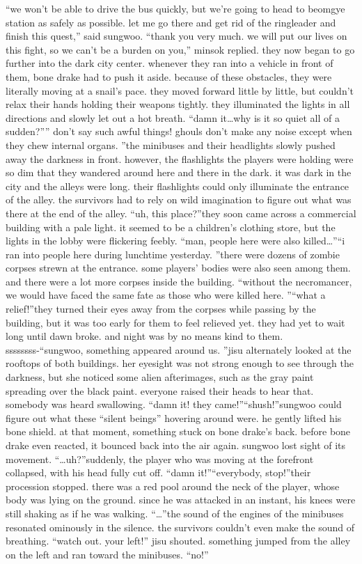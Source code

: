 “we won’t be able to drive the bus quickly, but we’re going to head to beomgye station as safely as possible.
 let me go there and get rid of the ringleader and finish this quest,” said sungwoo.
“thank you very much.
 we will put our lives on this fight, so we can’t be a burden on you,” minsok replied.
they now began to go further into the dark city center.
whenever they ran into a vehicle in front of them, bone drake had to push it aside.
because of these obstacles, they were literally moving at a snail’s pace.
they moved forward little by little, but couldn’t relax their hands holding their weapons tightly.
they illuminated the lights in all directions and slowly let out a hot breath.
“damn it…why is it so quiet all of a sudden?”” don’t say such awful things! ghouls don’t make any noise except when they chew internal organs.
”the minibuses and their headlights slowly pushed away the darkness in front.
 however, the flashlights the players were holding were so dim that they wandered around here and there in the dark.
it was dark in the city and the alleys were long.
 their flashlights could only illuminate the entrance of the alley.
 the survivors had to rely on wild imagination to figure out what was there at the end of the alley.
“uh, this place?”they soon came across a commercial building with a pale light.
 it seemed to be a children’s clothing store, but the lights in the lobby were flickering feebly.
“man, people here were also killed…”“i ran into people here during lunchtime yesterday.
”there were dozens of zombie corpses strewn at the entrance.
 some players’ bodies were also seen among them.
 and there were a lot more corpses inside the building.
“without the necromancer, we would have faced the same fate as those who were killed here.
”“what a relief!”they turned their eyes away from the corpses while passing by the building, but it was too early for them to feel relieved yet.
 they had yet to wait long until dawn broke.
and night was by no means kind to them.
ssssssss-“sungwoo, something appeared around us.
”jisu alternately looked at the rooftops of both buildings.
 her eyesight was not strong enough to see through the darkness, but she noticed some alien afterimages, such as the gray paint spreading over the black paint.
everyone raised their heads to hear that.
 somebody was heard swallowing.
“damn it! they came!”“shush!”sungwoo could figure out what these “silent beings” hovering around were.
he gently lifted his bone shield.
at that moment, something stuck on bone drake’s back.
 before bone drake even reacted, it bounced back into the air again.
 sungwoo lost sight of its movement.
“…uh?”suddenly, the player who was moving at the forefront collapsed, with his head fully cut off.
“damn it!”“everybody, stop!”their procession stopped.
 there was a red pool around the neck of the player, whose body was lying on the ground.
 since he was attacked in an instant, his knees were still shaking as if he was walking.
“…”the sound of the engines of the minibuses resonated ominously in the silence.
 the survivors couldn’t even make the sound of breathing.
“watch out.
 your left!” jisu shouted.
something jumped from the alley on the left and ran toward the minibuses.
“no!”

